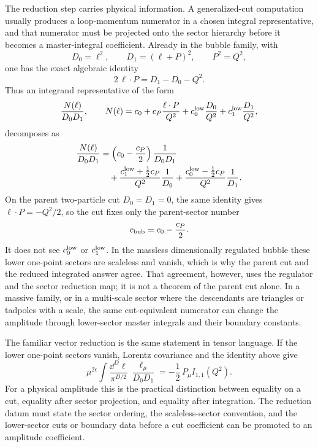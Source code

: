 \begin{controlledapproximation}
\label{ca:bubble-sector-projection}
The reduction step carries physical information.  A generalized-cut
computation usually produces a loop-momentum numerator in a chosen integral
representative, and that numerator must be projected onto the sector hierarchy
before it becomes a master-integral coefficient.  Already in the bubble family,
with
\[
  D_0=\ell^2,\qquad D_1=(\ell+P)^2,\qquad P^2=Q^2 ,
\]
one has the exact algebraic identity
\[
  2\,\ell\cdot P=D_1-D_0-Q^2 .
\]
Thus an integrand representative of the form
\begin{equation}
  \frac{N(\ell)}{D_0D_1},
  \qquad
  N(\ell)=
  c_0+c_P\frac{\ell\cdot P}{Q^2}
  +c_0^{\rm low}\frac{D_0}{Q^2}
  +c_1^{\rm low}\frac{D_1}{Q^2},
  \label{eq:bubble-numerator-sector-ansatz}
\end{equation}
decomposes as
\begin{equation}
  \begin{aligned}
  \frac{N(\ell)}{D_0D_1}
  &=
  \left(c_0-\frac{c_P}{2}\right)\frac1{D_0D_1}\\
  &\quad
  +\frac{c_1^{\rm low}+\frac12 c_P}{Q^2}\frac1{D_0}
  +\frac{c_0^{\rm low}-\frac12 c_P}{Q^2}\frac1{D_1}.
  \end{aligned}
  \label{eq:bubble-numerator-sector-projection}
\end{equation}
On the parent two-particle cut \(D_0=D_1=0\), the same identity gives
\(\ell\cdot P=-Q^2/2\), so the cut fixes only the parent-sector number
\[
  c_{\rm bub}=c_0-\frac{c_P}{2}.
\]
It does not see \(c_0^{\rm low}\) or \(c_1^{\rm low}\).  In the massless
dimensionally regulated bubble these lower one-point sectors are scaleless and
vanish, which is why the parent cut and the reduced integrated answer agree.
That agreement, however, uses the regulator and the sector reduction map; it
is not a theorem of the parent cut alone.  In a massive family, or in a
multi-scale sector where the descendants are triangles or tadpoles with a
scale, the same cut-equivalent numerator can change the amplitude through
lower-sector master integrals and their boundary constants.

The familiar vector reduction is the same statement in tensor language.  If
the lower one-point sectors vanish, Lorentz covariance and the identity above
give
\begin{equation}
  \mu^{2\epsilon}
  \int\frac{\dd^D\ell}{\pi^{D/2}}\,
  \frac{\ell_\mu}{D_0D_1}
  =
  -\frac12\,P_\mu I_{1,1}(Q^2).
  \label{eq:bubble-vector-pv-reduction}
\end{equation}
For a physical amplitude this is the practical distinction between equality
on a cut, equality after sector projection, and equality after integration.
The reduction datum must state the sector ordering, the scaleless-sector
convention, and the lower-sector cuts or boundary data before a cut
coefficient can be promoted to an amplitude coefficient.
\end{controlledapproximation}

